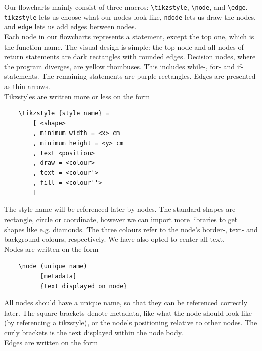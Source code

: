 {

Our flowcharts mainly consist of three macros: \texttt{\textbackslash tikzstyle}, \texttt{\textbackslash node}, and \texttt{\textbackslash edge}. \texttt{tikzstyle} lets us choose what our nodes look like, \texttt{ndode} lets us draw the nodes, and \texttt{edge} lets us add edges between nodes. \hfill \\

Each node in our flowcharts represents a statement, except the top one, which is the function name. The visual design is simple: the top node and all nodes of return statements are dark rectangles with rounded edges. Decision nodes, where the program diverges, are yellow rhombuses. This includes while-, for- and if-statements. The remaining statements are purple rectangles. Edges are presented as thin arrows. \hfill \\

Tikzstyles are written more or less on the form

\begin{verbatim}
    \tikzstyle {style name} =
        [ <shape>
        , minimum width = <x> cm
        , minimum height = <y> cm
        , text <position>
        , draw = <colour>
        , text = <colour'>
        , fill = <colour''>
        ]
\end{verbatim}

The style name will be referenced later by nodes. The standard shapes are rectangle, circle or coordinate, however we can import more libraries to get shapes like e.g. diamonds. The three colours refer to the node's border-, text- and background colours, respectively. We have also opted to center all text. \hfill \\

Nodes are written on the form

\begin{verbatim}
    \node (unique name)
          [metadata]
          {text displayed on node}
\end{verbatim}

All nodes should have a unique name, so that they can be referenced correctly later. The square brackets denote metadata, like what the node should look like (by referencing a tikzstyle), or the node's positioning relative to other nodes. The curly brackets is the text displayed within the node body. \hfill \\

Edges are written on the form

}
